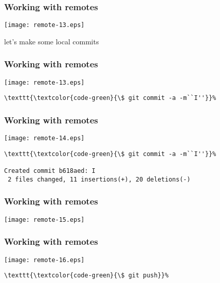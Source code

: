 \documentclass[english]{beamer}
\newcommand{\CMD}[1]{%
\texttt{\textcolor{code-green}{#1}}%
}
\begin{document}
\begin{frame}[fragile]
\frametitle{Working with remotes}

\texttt{[image: remote-13.eps]}

\begin{center}
        let's make some local commits
\end{center}
\vspace{\textheight}
\end{frame}

\begin{frame}[fragile]
\frametitle{Working with remotes}

\texttt{[image: remote-13.eps]}

\begin{Verbatim}[commandchars=\\\{\}]
\CMD{\$ git commit -a -m``I''}
\end{Verbatim}
\vspace{\textheight}
\end{frame}

\begin{frame}[fragile]
\frametitle{Working with remotes}

\texttt{[image: remote-14.eps]}

{\tiny
\begin{Verbatim}[commandchars=\\\{\}]
\CMD{\$ git commit -a -m``I''}
Created commit b618aed: I
 2 files changed, 11 insertions(+), 20 deletions(-)
\end{Verbatim}
}
\vspace{\textheight}
\end{frame}

\begin{frame}[fragile]
\frametitle{Working with remotes}

\texttt{[image: remote-15.eps]}

\vspace{\textheight}
\end{frame}

\begin{frame}[fragile]
\frametitle{Working with remotes}

\texttt{[image: remote-16.eps]}

\begin{Verbatim}[commandchars=\\\{\}]
\CMD{\$ git push}
\end{Verbatim}
\vspace{\textheight}
\end{frame}
\end{document}
